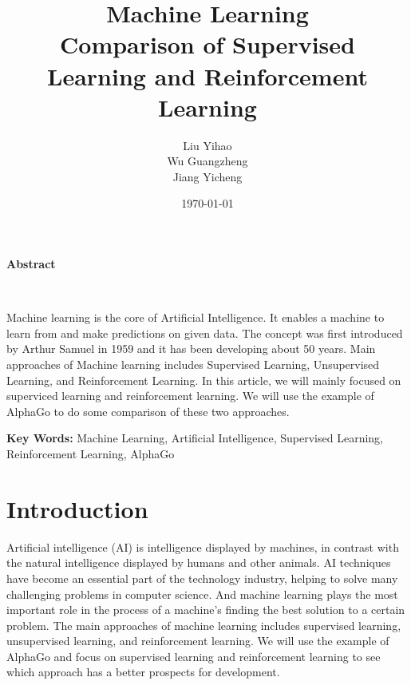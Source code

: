 \documentclass[a4paper,12pt]{article}
\begin{document}
\begin{titlepage}


\title{\vspace{5cm}\vspace{1cm}\textbf{Machine Learning \\ Comparison of Supervised Learning and Reinforcement Learning }\vspace{0.8cm}}
\author{ Liu Yihao \\
Wu Guangzheng\\
Jiang Yicheng}
\date{\today}
\maketitle
\vspace{1cm}
\begin{center}
\begin{Large}
\textbf{Abstract}
\end{Large}\\

\end{center}

Machine learning is the core of Artificial Intelligence. It enables a machine to learn from and make predictions on given data. The concept was first introduced by Arthur Samuel in 1959 and it has been developing about 50 years. Main approaches of Machine learning includes Supervised Learning, Unsupervised Learning, and  Reinforcement Learning. In this article, we will mainly focused on superviced learning and reinforcement learning. We will use the example of AlphaGo to do some comparison of these two approaches. 

\vspace{3mm}
\textbf{Key Words: }Machine Learning, Artificial Intelligence, Supervised Learning, Reinforcement Learning, AlphaGo
\thispagestyle{empty}
\end{titlepage}
\setcounter{page}{1}


\newpage

\section{Introduction}
Artificial intelligence (AI) is intelligence displayed by machines, in contrast with the natural intelligence displayed by humans and other animals. AI techniques have become an essential part of the technology industry, helping to solve many challenging problems in computer science. And machine learning plays the most important role in the process of a machine's finding the best solution to a certain problem. The main approaches of machine learning includes supervised learning, unsupervised learning, and  reinforcement learning. We will use the example of AlphaGo and focus on supervised learning and reinforcement learning to see which approach has a better prospects for development.
\end{document}
